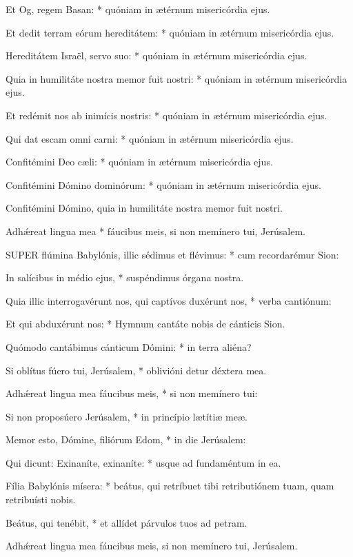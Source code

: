 Et Og, regem Basan: * quóniam in ætérnum misericórdia ejus.

Et dedit terram eórum hereditátem: * quóniam in ætérnum misericórdia ejus.

Hereditátem Israël, servo suo: * quóniam in ætérnum misericórdia ejus.

Quia in humilitáte nostra memor fuit nostri: * quóniam in ætérnum misericórdia ejus.

Et redémit nos ab inimícis nostris: * quóniam in ætérnum misericórdia ejus.

Qui dat escam omni carni: * quóniam in ætérnum misericórdia ejus.

Confitémini Deo cæli: * quóniam in ætérnum misericórdia ejus.

Confitémini Dómino dominórum: * quóniam in ætérnum misericórdia ejus.

 Confitémini Dómino, quia in humilitáte nostra memor fuit nostri.

 Adhǽreat lingua mea * fáucibus meis, si non memínero tui, Jerúsalem.


\lettrine[lines=2]{S}{UPER} flúmina Babylónis, illic sédimus et flévimus: * cum recordarémur Sion:

In salícibus in médio ejus, * suspéndimus órgana nostra.

Quia illic interrogavérunt nos, qui captívos duxérunt nos, * verba cantiónum:

Et qui abduxérunt nos: * Hymnum cantáte nobis de cánticis Sion.

Quómodo cantábimus cánticum Dómini: * in terra aliéna?

Si oblítus fúero tui, Jerúsalem, * oblivióni detur déxtera mea.

Adhǽreat lingua mea fáucibus meis, * si non memínero tui:

Si non proposúero Jerúsalem, * in princípio lætítiæ meæ.

Memor esto, Dómine, filiórum Edom, * in die Jerúsalem:

Qui dicunt: Exinaníte, exinaníte: * usque ad fundaméntum in ea.

Fília Babylónis mísera: * beátus, qui retríbuet tibi retributiónem tuam, quam retribuísti nobis.

Beátus, qui tenébit, * et allídet párvulos tuos ad petram.

 Adhǽreat lingua mea fáucibus meis, si non memínero tui, Jerúsalem.

